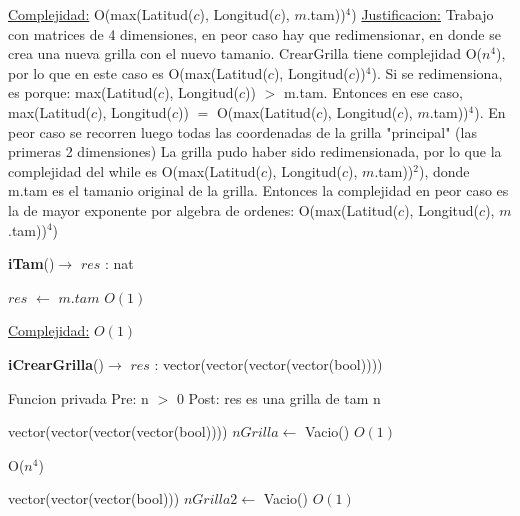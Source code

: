 \begin{Algoritmos}
\begin{algorithmic}[1]
\medskip
\Statex \underline{Complejidad:} O(max(Latitud($c$), Longitud($c$), $m$.tam))$^4$)
\Statex \underline{Justificacion:} Trabajo con matrices de 4 dimensiones, en peor caso hay que redimensionar, en donde se crea una nueva grilla con el nuevo tamanio. CrearGrilla tiene complejidad O($n^4$), por lo que en este caso es O(max(Latitud($c$), Longitud($c$))$^4$). Si se redimensiona, es porque:  max(Latitud($c$), Longitud($c$)) $> $ m.tam. Entonces en ese caso,  max(Latitud($c$), Longitud($c$)) $=$ O(max(Latitud($c$), Longitud($c$), $m$.tam))$^4$). 
\Statex En peor caso se recorren luego todas las coordenadas de la grilla "principal" (las primeras 2 dimensiones) La grilla pudo haber sido redimensionada, por lo que la complejidad del while es O(max(Latitud($c$), Longitud($c$), $m$.tam))$^2$), donde m.tam es el tamanio original de la grilla. Entonces la complejidad en peor caso es la de mayor exponente por algebra de ordenes: O(max(Latitud($c$), Longitud($c$), $m$.tam))$^4$)


\end{algorithmic}



\begin{algorithm}[H]
{\textbf{iTam}()$\to$ $res$ : nat}
\begin{algorithmic}[1]

\State $res$ $\gets$ $m$.$tam$ \Comment $O(1)$

\medskip
\Statex \underline{Complejidad:} $O(1)$

\end{algorithmic}
\end{algorithm}






\begin{algorithm}[H]
{\textbf{iCrearGrilla}()$\to$ $res$ : vector(vector(vector(vector(bool))))}
\begin{algorithmic}[1]

\Statex Funcion privada 
\Statex Pre: n $>$ 0 
\Statex Post: res es una grilla de tam n

\State vector(vector(vector(vector(bool)))) $nGrilla \gets$ Vacio() \Comment $O(1)$

   \Comment O($n^4$)

	\State vector(vector(vector(bool))) $nGrilla2 \gets$ Vacio()  \Comment $O(1)$
	

\end{algorithmic}
\end{algorithm}
\end{Algoritmos}
